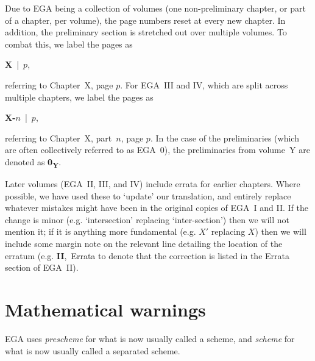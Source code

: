 Due to EGA being a collection of volumes (one non-preliminary chapter, or part of a chapter, per volume), the page numbers reset at every new chapter.
In addition, the preliminary section is stretched out over multiple volumes.
To combat this, we label the pages as
\begin{center}
  \textbf{X}~|~$p$,
\end{center}
referring to Chapter~X, page $p$.
For EGA~III and IV, which are split across multiple chapters, we label the pages as
\begin{center}
  \textbf{X-$n$}~|~$p$,
\end{center}
referring to Chapter~X, part~$n$, page $p$.
In the case of the preliminaries (which are often collectively referred to as EGA~0), the preliminaries from volume~Y are denoted as \textbf{0\textsubscript{Y}}.

\sectionbreak

Later volumes (EGA~II, III, and IV) include errata for earlier chapters.
Where possible, we have used these to `update' our translation, and entirely replace whatever mistakes might have been in the original copies of EGA~I and II.
If the change is minor (e.g. `intersection' replacing `inter-section') then we will not mention it; if it is anything more fundamental (e.g. $X'$ replacing $X$) then we will include some margin note on the relevant line detailing the location of the erratum (e.g. \textbf{II},~Errata to denote that the correction is listed in the Errata section of EGA~II).

\section*{Mathematical warnings}
EGA uses \emph{prescheme} for what is now usually called a scheme, and \emph{scheme} for what is now usually called a separated scheme.



